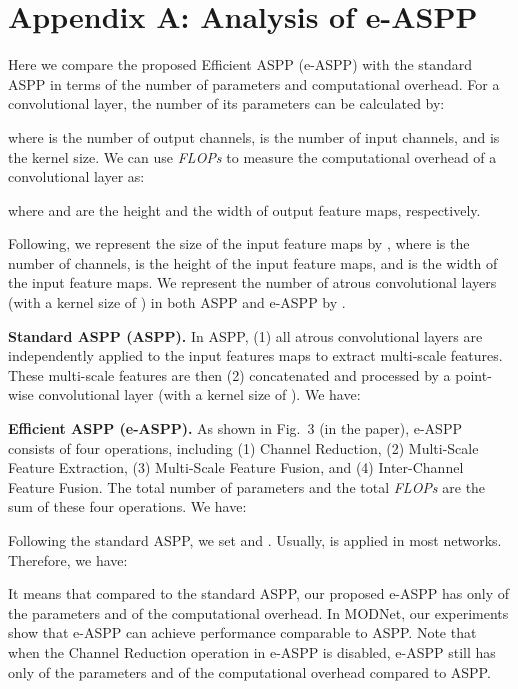 \documentclass[letterpaper]{article} \usepackage{aaai22}  \usepackage{times}  \usepackage{helvet}  \usepackage{courier}  \usepackage[hyphens]{url}  \usepackage{graphicx} \urlstyle{rm} \def\UrlFont{\rm}  \usepackage{natbib}  \usepackage{caption} \usepackage{booktabs}
\begin{document}
\section*{Appendix A: Analysis of e-ASPP}
Here we compare the proposed Efficient ASPP (e-ASPP) with the standard ASPP in terms of the number of parameters and computational overhead. For a convolutional layer, the number of its parameters  can be calculated by:

where  is the number of output channels,  is the number of input channels, and  is the kernel size. We can use {\it FLOPs} to measure the computational overhead  of a convolutional layer as:

where  and  are the height and the width of output feature maps, respectively.

Following, we represent the size of the input feature maps by , where  is the number of channels,  is the height of the input feature maps, and  is the width of the input feature maps. We represent the number of atrous convolutional layers (with a kernel size of ) in both ASPP and e-ASPP by .


\textbf{Standard ASPP (ASPP).} In ASPP, (1) all atrous convolutional layers are independently applied to the input features maps to extract multi-scale features. These multi-scale features are then (2) concatenated and processed by a point-wise convolutional layer (with a kernel size of ). We have:








\textbf{Efficient ASPP (e-ASPP).} As shown in Fig.\,{\color{red} 3} (in the paper), e-ASPP consists of four operations, including (1) Channel Reduction, (2) Multi-Scale Feature Extraction, (3) Multi-Scale Feature Fusion, and (4) Inter-Channel Feature Fusion. The total number of parameters and the total {\it FLOPs} are the sum of these four operations. We have:







Following the standard ASPP, we set  and . Usually,  is applied in most networks. Therefore, we have:


It means that compared to the standard ASPP, our proposed e-ASPP
has only  of the parameters and  of the computational
overhead. In MODNet, our experiments show that e-ASPP
can achieve performance comparable to ASPP.
Note that when the Channel Reduction operation in e-ASPP is disabled, e-ASPP still has only  of the parameters and  of the computational overhead compared to ASPP.
\end{document}
